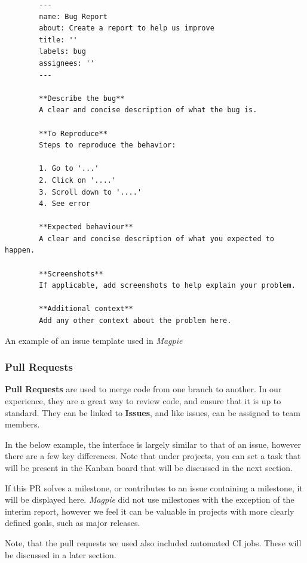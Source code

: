 \documentclass[preview]{standalone}
\begin{document}
\begin{listing}[htbp]
    \centering{}
    \begin{verbatim}
        ---
        name: Bug Report
        about: Create a report to help us improve
        title: ''
        labels: bug
        assignees: ''
        ---

        **Describe the bug**
        A clear and concise description of what the bug is.

        **To Reproduce**
        Steps to reproduce the behavior:

        1. Go to '...'
        2. Click on '....'
        3. Scroll down to '....'
        4. See error

        **Expected behaviour**
        A clear and concise description of what you expected to happen.

        **Screenshots**
        If applicable, add screenshots to help explain your problem.

        **Additional context**
        Add any other context about the problem here.
    \end{verbatim}
    \caption{An example of an issue template used in \textit{Magpie}}
\end{listing}

\newpage{}

\subsubsection{Pull Requests}
\textbf{Pull Requests} are used to merge code from one branch to another. In our
experience, they are a great way to review code, and ensure that it is up to
standard. They can be linked to \textbf{Issues}, and like issues, can be
assigned to team members.

In the below example, the interface is largely similar to that of an issue,
however there are a few key differences. Note that under projects, you can set a
task that will be present in the Kanban board that will be discussed in the next
section.

If this PR solves a milestone, or contributes to an issue containing a
milestone, it will be displayed here. \textit{Magpie} did not use milestones
with the exception of the interim report, however we feel it can be valuable in
projects with more clearly defined goals, such as major releases.

Note, that the pull requests we used also included automated CI jobs. These will
be discussed in a later section.
\end{document}
